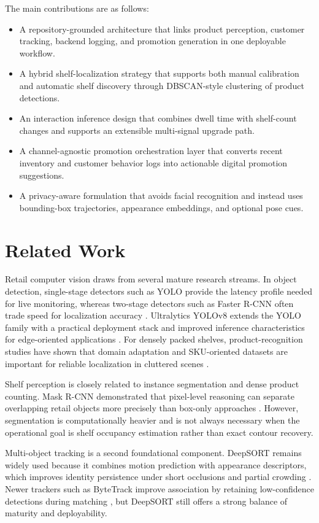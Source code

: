 \documentclass[conference]{IEEEtran}
\begin{document}
The main contributions are as follows:
\begin{itemize}
    \item A repository-grounded architecture that links product perception, customer tracking, backend logging, and promotion generation in one deployable workflow.
    \item A hybrid shelf-localization strategy that supports both manual calibration and automatic shelf discovery through DBSCAN-style clustering of product detections.
    \item An interaction inference design that combines dwell time with shelf-count changes and supports an extensible multi-signal upgrade path.
    \item A channel-agnostic promotion orchestration layer that converts recent inventory and customer behavior logs into actionable digital promotion suggestions.
    \item A privacy-aware formulation that avoids facial recognition and instead uses bounding-box trajectories, appearance embeddings, and optional pose cues.
\end{itemize}

\section{Related Work}

Retail computer vision draws from several mature research streams. In object detection, single-stage detectors such as YOLO provide the latency profile needed for live monitoring, whereas two-stage detectors such as Faster R-CNN often trade speed for localization accuracy \cite{redmon2016yolo,ren2015faster}. Ultralytics YOLOv8 extends the YOLO family with a practical deployment stack and improved inference characteristics for edge-oriented applications \cite{jocher2023yolov8}. For densely packed shelves, product-recognition studies have shown that domain adaptation and SKU-oriented datasets are important for reliable localization in cluttered scenes \cite{tonioni2017product}.

Shelf perception is closely related to instance segmentation and dense product counting. Mask R-CNN demonstrated that pixel-level reasoning can separate overlapping retail objects more precisely than box-only approaches \cite{he2017mask}. However, segmentation is computationally heavier and is not always necessary when the operational goal is shelf occupancy estimation rather than exact contour recovery.

Multi-object tracking is a second foundational component. DeepSORT remains widely used because it combines motion prediction with appearance descriptors, which improves identity persistence under short occlusions and partial crowding \cite{wojke2017simple}. Newer trackers such as ByteTrack improve association by retaining low-confidence detections during matching \cite{zhang2022bytetrack}, but DeepSORT still offers a strong balance of maturity and deployability.
\end{document}

